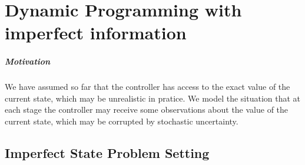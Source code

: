 \chapter{Dynamic Programming with imperfect information}
\paragraph{Motivation}
We have assumed so far that the controller has access to the exact value of the current state, which may be unrealistic in pratice.
We model the situation that at each stage the controller may receive some observations about the value of the current state, which may be corrupted by stochastic uncertainty.

\section{Imperfect State Problem Setting}
